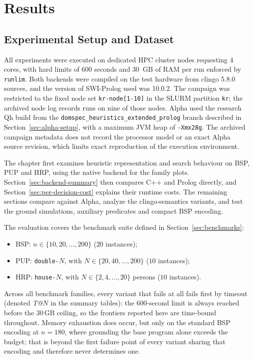 \chapter{Results}
\label{sec:results}

\section{Experimental Setup and Dataset}
\label{sec:dataset}

All experiments were executed on dedicated HPC cluster nodes requesting 4 cores, with hard limits of 600 seconds and 30~GB of RAM per run enforced by \texttt{runlim}. Both backends were compiled on the test hardware from clingo 5.8.0 sources, and the version of SWI-Prolog used was 10.0.2. The campaign was restricted to the fixed node set \texttt{kr-node[1-10]} in the SLURM partition \texttt{kr}; the archived node log records runs on nine of those nodes. Alpha used the research Qh build from the \texttt{domspec\_heuristics\_extended\_prolog} branch described in Section~\ref{sec:alpha-setup}, with a maximum JVM heap of \texttt{-Xmx28g}. The archived campaign metadata does not record the processor model or an exact Alpha source revision, which limits exact reproduction of the execution environment.

The chapter first examines heuristic representation and search behaviour on BSP, PUP and HRP, using the native backend for the family plots. Section~\ref{sec:backend-summary} then compares C++ and Prolog directly, and Section~\ref{sec:per-decision-cost} explains their runtime costs. The remaining sections compare against Alpha, analyze the clingo-semantics variants, and test the ground simulations, auxiliary predicates and compact BSP encoding.

The evaluation covers the benchmark suite defined in Section~\ref{sec:benchmarks}:
\begin{itemize}[noitemsep,topsep=2pt]
    \item BSP: $n \in \{10, 20, \ldots, 200\}$ ($20$ instances);
    \item PUP: \texttt{double-$N$}, with $N \in \{20, 40, \ldots, 200\}$ ($10$ instances);
    \item HRP: \texttt{house-$N$}, with $N \in \{2, 4, \ldots, 20\}$ persons ($10$ instances).
\end{itemize}

Across all benchmark families, every variant that fails at all fails first by timeout (denoted \emph{T@$N$} in the summary tables): the 600-second limit is always reached before the 30\,GB ceiling, so the frontiers reported here are time-bound throughout. Memory exhaustion does occur, but only on the standard BSP encoding at $n = 180$, where grounding the base program alone exceeds the budget; that is beyond the first failure point of every variant sharing that encoding and therefore never determines one.

